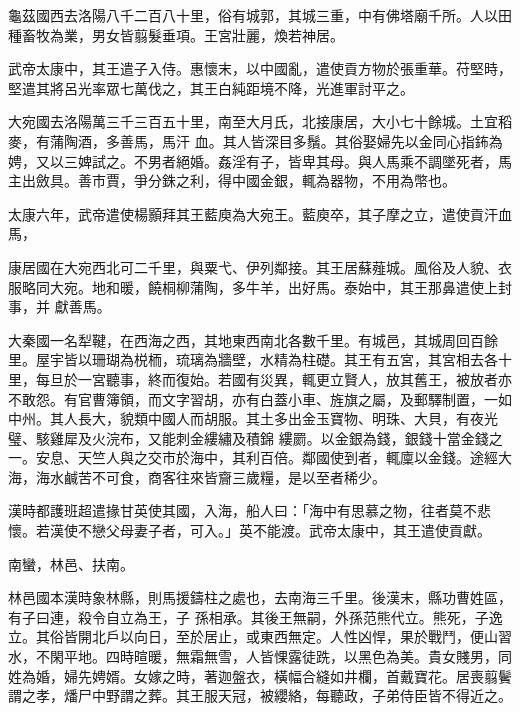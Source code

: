 \begin{pinyinscope}
 龜茲國西去洛陽八千二百八十里，俗有城郭，其城三重，中有佛塔廟千所。人以田種畜牧為業，男女皆翦髮垂項。王宮壯麗，煥若神居。



 武帝太康中，其王遣子入侍。惠懷末，以中國亂，遣使貢方物於張重華。苻堅時，堅遣其將呂光率眾七萬伐之，其王白純距境不降，光進軍討平之。



 大宛國去洛陽萬三千三百五十里，南至大月氏，北接康居，大小七十餘城。土宜稻麥，有蒲陶酒，多善馬，馬汗
 血。其人皆深目多鬚。其俗娶婦先以金同心指鈽為娉，又以三婢試之。不男者絕婚。姦淫有子，皆卑其母。與人馬乘不調墜死者，馬主出斂具。善市賈，爭分銖之利，得中國金銀，輒為器物，不用為幣也。



 太康六年，武帝遣使楊顥拜其王藍庾為大宛王。藍庾卒，其子摩之立，遣使貢汗血馬，



 康居國在大宛西北可二千里，與粟弋、伊列鄰接。其王居蘇薤城。風俗及人貌、衣服略同大宛。地和暖，饒桐柳蒲陶，多牛羊，出好馬。泰始中，其王那鼻遣使上封事，并
 獻善馬。



 大秦國一名犁鞬，在西海之西，其地東西南北各數千里。有城邑，其城周回百餘里。屋宇皆以珊瑚為棁栭，琉璃為牆壁，水精為柱礎。其王有五宮，其宮相去各十里，每旦於一宮聽事，終而復始。若國有災異，輒更立賢人，放其舊王，被放者亦不敢怨。有官曹簿領，而文字習胡，亦有白蓋小車、旌旗之屬，及郵驛制置，一如中州。其人長大，貌類中國人而胡服。其土多出金玉寶物、明珠、大貝，有夜光璧、駭雞犀及火浣布，又能刺金縷繡及積錦
 縷罽。以金銀為錢，銀錢十當金錢之一。安息、天竺人與之交市於海中，其利百倍。鄰國使到者，輒廩以金錢。途經大海，海水鹹苦不可食，商客往來皆齎三歲糧，是以至者稀少。



 漢時都護班超遣掾甘英使其國，入海，船人曰：「海中有思慕之物，往者莫不悲懷。若漢使不戀父母妻子者，可入。」英不能渡。武帝太康中，其王遣使貢獻。



 南蠻，林邑、扶南。



 林邑國本漢時象林縣，則馬援鑄柱之處也，去南海三千里。後漢末，縣功曹姓區，有子曰連，殺令自立為王，子
 孫相承。其後王無嗣，外孫范熊代立。熊死，子逸立。其俗皆開北戶以向日，至於居止，或東西無定。人性凶悍，果於戰鬥，便山習水，不閑平地。四時暄暖，無霜無雪，人皆惈露徒跣，以黑色為美。貴女賤男，同姓為婚，婦先娉婿。女嫁之時，著迦盤衣，橫幅合縫如井欄，首戴寶花。居喪翦鬢謂之孝，燔尸中野謂之葬。其王服天冠，被纓絡，每聽政，子弟侍臣皆不得近之。




\end{pinyinscope}
